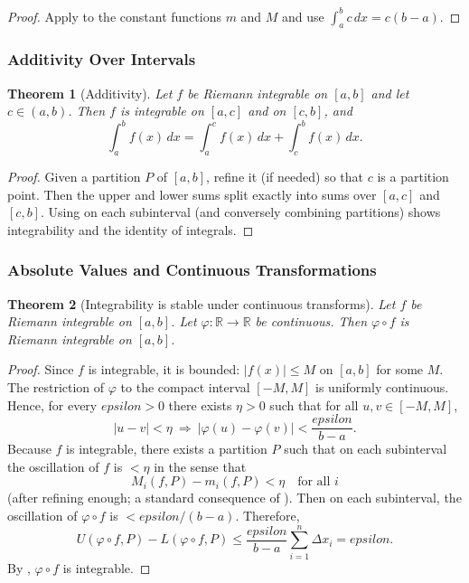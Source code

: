\documentclass[12pt]{article}
\numberwithin{equation}{section}
\def\abs#1{|#1|}
\def\eps{epsilon}
\def\diff{d}
\newcommand{\RR}{\mathbb{R}}
\DeclarePairedDelimiter{\abs}{\lvert}{\rvert}
\newcommand{\eps}{\varepsilon}               %
\newcommand{\diff}{\mathop{}\!\mathrm{d}}    %
\theoremstyle{plain}
\newtheorem{theorem}{Theorem}[section]
\theoremstyle{definition}
\theoremstyle{remark}
\begin{document}
\begin{proof}
Apply  to the constant functions $m$ and $M$ and use $\int_a^b c\,\diff x=c(b-a)$.
\end{proof}

\subsubsection{Additivity Over Intervals}

\begin{theorem}[Additivity]\label{thm:int-add}
Let $f$ be Riemann integrable on $[a,b]$ and let $c\in(a,b)$.
Then $f$ is integrable on $[a,c]$ and on $[c,b]$, and
\[
\int_a^b f(x)\,\diff x = \int_a^c f(x)\,\diff x + \int_c^b f(x)\,\diff x.
\]
\end{theorem}

\begin{proof}
Given a partition $P$ of $[a,b]$, refine it (if needed) so that $c$ is a partition point.
Then the upper and lower sums split exactly into sums over $[a,c]$ and $[c,b]$.
Using  on each subinterval (and conversely combining partitions) shows integrability and the identity of integrals.
\end{proof}

\subsubsection{Absolute Values and Continuous Transformations}

\begin{theorem}[Integrability is stable under continuous transforms]\label{thm:cont-transform}
Let $f$ be Riemann integrable on $[a,b]$.
Let $\varphi:\RR\to\RR$ be continuous.
Then $\varphi\circ f$ is Riemann integrable on $[a,b]$.
\end{theorem}

\begin{proof}
Since $f$ is integrable, it is bounded: $\abs{f(x)}\le M$ on $[a,b]$ for some $M$.
The restriction of $\varphi$ to the compact interval $[-M,M]$ is uniformly continuous.
Hence, for every $\eps>0$ there exists $\eta>0$ such that for all $u,v\in[-M,M]$,
\[
\abs{u-v}<\eta \ \Rightarrow\ \abs{\varphi(u)-\varphi(v)}<\frac{\eps}{b-a}.
\]
Because $f$ is integrable, there exists a partition $P$ such that on each subinterval the oscillation of $f$ is $<\eta$ in the sense that
\[
M_i(f,P)-m_i(f,P)<\eta \quad\text{for all }i
\]
(after refining enough; a standard consequence of ).
Then on each subinterval, the oscillation of $\varphi\circ f$ is $<\eps/(b-a)$.
Therefore,
\[
U(\varphi\circ f,P)-L(\varphi\circ f,P)
\le \frac{\eps}{b-a}\sum_{i=1}^n \Delta x_i
=\eps.
\]
By , $\varphi\circ f$ is integrable.
\end{proof}
\end{document}
